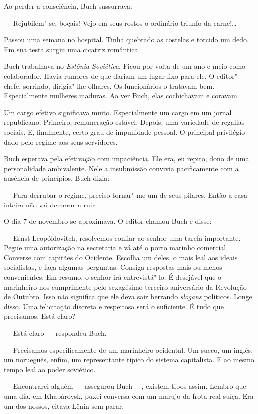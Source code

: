 Ao perder a consciência, Buch sussurrava:

--- Rejubilem"-se, boçais! Vejo em seus rostos o ordinário triunfo da
carne!\ldots{}

Passou uma semana no hospital. Tinha quebrado as costelas e torcido um
dedo. Em sua testa surgiu uma cicatriz romântica.

Buch trabalhava no \emph{Estônia Soviética}. Ficou por volta de um ano e
meio como colaborador. Havia rumores de que dariam um lugar fixo para
ele. O editor"-chefe, sorrindo, dirigia"-lhe olhares. Os funcionários o
tratavam bem. Especialmente mulheres maduras. Ao ver Buch, elas
cochichavam e coravam.

Um cargo efetivo significava muito. Especialmente um cargo em um jornal
republicano. Primeiro, remuneração estável. Depois, uma variedade de
regalias sociais. E, finalmente, certo grau de impunidade pessoal. O
principal privilégio dado pelo regime aos seus servidores.

Buch esperava pela efetivação com impaciência. Ele era, eu repito, dono
de uma personalidade ambivalente. Nele a insubmissão convivia
pacificamente com a ausência de princípios. Buch dizia:

--- Para derrubar o regime, preciso tornar"-me um de seus pilares. Então
a casa inteira não vai demorar a ruir\ldots{}

O dia 7 de novembro se aproximava. O editor chamou Buch e disse:

--- Ernst Leopóldovitch, resolvemos confiar ao senhor uma tarefa
importante. Pegue uma autorização na secretaria e vá até o porto marinho
comercial. Converse com capitães do Ocidente. Escolha um deles, o mais
leal aos ideais socialistas, e faça algumas perguntas. Consiga respostas
mais ou menos convenientes. Em resumo, o senhor irá entrevistá"-lo. É
desejável que o marinheiro nos cumprimente pelo sexagésimo terceiro
aniversário da Revolução de Outubro. Isso não significa que ele deva
sair berrando \emph{slogans} políticos. Longe disso. Uma felicitação
discreta e respeitosa será o suficiente. É tudo que precisamos. Está
claro?

--- Está claro --- respondeu Buch.

--- Precisamos especificamente de um marinheiro ocidental. Um sueco, um
inglês, um norueguês, enfim, um representante típico do sistema
capitalista. E ao mesmo tempo leal ao poder soviético.

--- Encontrarei alguém --- assegurou Buch ---, existem tipos assim.
Lembro que uma dia, em Khabárovsk, puxei conversa com um marujo da frota
real suíça. Era um dos nossos, citava Lênin sem parar.

